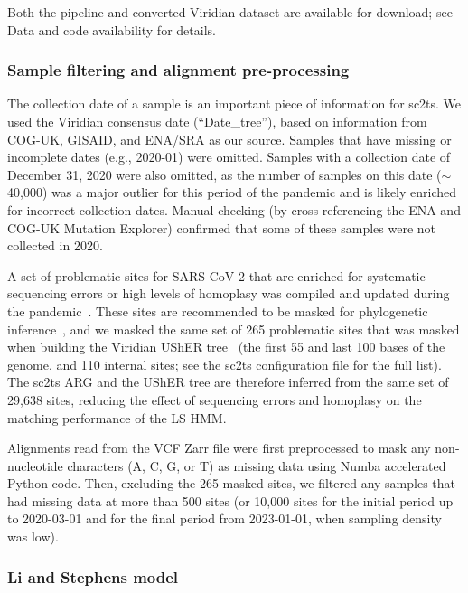 \documentclass[12pt]{article}
\begin{document}
Both the pipeline and converted Viridian dataset are available for download;
see Data and code availability for details.


\subsubsection*{Sample filtering and alignment pre-processing}

The collection date of a sample
is an important piece of information for sc2ts.
We used the Viridian consensus date (``Date\_tree''),
based on information from COG-UK, GISAID, and ENA/SRA as our source.
Samples that have missing or incomplete dates (e.g., 2020-01) were omitted.
Samples with a collection date of December 31, 2020
were also omitted,
as the number of samples on this date ($\sim$40,000) was a major outlier
for this period of the pandemic and is likely enriched
for incorrect collection dates.
Manual checking (by cross-referencing the ENA and COG-UK Mutation Explorer)
confirmed that some of these samples were not collected in 2020.

A set of problematic sites
for SARS-CoV-2 that are enriched for systematic sequencing errors or
high levels of homoplasy was compiled and updated during
the pandemic~\cite{DeMaio2020issues,Turakhia2020stability}.
These sites are recommended to be masked for phylogenetic
inference~\cite{Turakhia2020stability}, and
we masked the same set of 265 problematic sites that was masked
when building the Viridian UShER tree~\cite{Hunt2026}
(the first 55 and last 100 bases of the genome, and 110 internal sites;
see the sc2ts configuration file for the full list).
The sc2ts ARG and the UShER tree are therefore inferred from the
same set of 29,638 sites,
reducing the effect of sequencing errors and homoplasy
on the matching performance of the LS HMM.

Alignments read from the VCF Zarr file were first preprocessed
to mask any non-nucleotide characters (A, C, G, or T) as missing data
using Numba accelerated \cite{Lam2015numba} Python code.
Then, excluding the 265 masked sites, we filtered any samples that had missing data at more than 500 sites (or 10,000 sites for the initial period up to 2020-03-01
and for the final period from 2023-01-01,
when sampling density was low).

\subsubsection*{Li and Stephens model}
\end{document}
